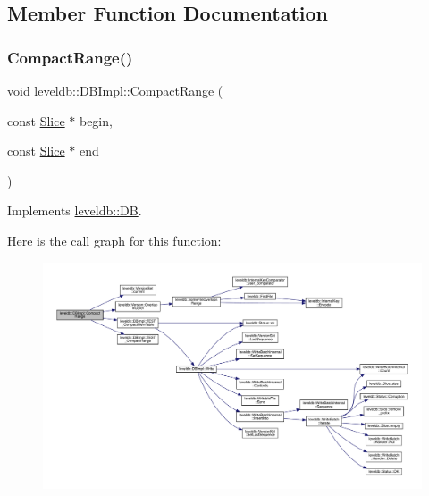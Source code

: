 \subsection{Member Function Documentation}
\mbox{\label{classleveldb_1_1_d_b_impl_aa6df0739fc0b49380c284347e411b8ed}} 
\subsubsection{\texorpdfstring{CompactRange()}{CompactRange()}}
{\footnotesize\ttfamily void leveldb\+::\+D\+B\+Impl\+::\+Compact\+Range (\begin{DoxyParamCaption}\item[{const \mbox{\hyperlink{classleveldb_1_1_slice}{Slice}} $\ast$}]{begin,  }\item[{const \mbox{\hyperlink{classleveldb_1_1_slice}{Slice}} $\ast$}]{end }\end{DoxyParamCaption})\hspace{0.3cm}{\ttfamily [virtual]}}



Implements \mbox{\hyperlink{classleveldb_1_1_d_b_aeea500cbc6704454b3be6908d5da8b3a}{leveldb\+::\+DB}}.

Here is the call graph for this function\+:
\nopagebreak
\begin{figure}[H]
\begin{center}
\leavevmode
\includegraphics[width=350pt]{classleveldb_1_1_d_b_impl_aa6df0739fc0b49380c284347e411b8ed_cgraph}
\end{center}
\end{figure}
\mbox{\label{classleveldb_1_1_d_b_impl_af050f77e8c22bd6638fed5a46a59399d}} 
